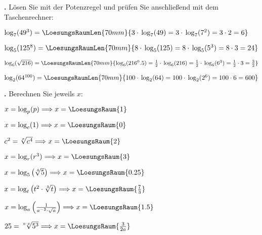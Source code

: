 \newpage

\textbf{\bbwAufgabenNummer{}.}
Lösen Sie mit der Potenzregel und prüfen Sie anschließend mit dem Taschenrechner: 

\begin{bbwAufgabenBlock}
\item $\log_7(49^3) = \LoesungsRaumLen{70mm}{3\cdot{}\log_7(49) = 3 \cdot{}  \log_7(7^2) = 3\cdot{} 2 = 6}$

\item
 $\log_5(125^8) = \LoesungsRaumLen{70mm}{8 \cdot{}\log_5(125) = 8 \cdot{}  \log_5(5^3) =  8\cdot{} 3 = 24}$

\item  $\log_6(\sqrt{216}) = \LoesungsRaumLen{70mm}{\log_6(216^0.5)= \frac12
   \cdot{}\log_6(216) = \frac12 \cdot{}  \log_6(6^3) = \frac12\cdot{} 3 = \frac32}$
   
\item $\log_2(64^{100}) = \LoesungsRaumLen{70mm}{100 \cdot{}\log_2(64) = 100 \cdot{}  \log_2(2^6) =  100\cdot{} 6 = 600}$

%
\end{bbwAufgabenBlock}

\TNTeop{}

\newpage

\textbf{\bbwAufgabenNummer{}.}
Berechnen Sie jeweils $x$:

\begin{bbwAufgabenBlock}
\item $x=\log_p(p) \Longrightarrow x =    \LoesungsRaum{1}$
\item $x=\log_c(1) \Longrightarrow x =    \LoesungsRaum{0}$
\item $c^2= \sqrt[x]{c^4} \Longrightarrow x =    \LoesungsRaum{2}$

\item $x=\log_r(r^3) \Longrightarrow x =    \LoesungsRaum{3}$
\item $x=\log_5\left(\sqrt[4]{5}\right) \Longrightarrow x =    \LoesungsRaum{0.25}$
\item $x=\log_t\left(t^2\cdot{}\sqrt[3]{t}\right) \Longrightarrow x =    \LoesungsRaum{\frac73}$
\noTRAINER{\newpage}
\item $x=\log_a\left( \frac1{a^{-2}\cdot{} \sqrt{a}} \right) \Longrightarrow x =    \LoesungsRaum{1.5}$
\item $25=\sqrt[a\cdot{}x]{5^3}  \Longrightarrow x =    \LoesungsRaum{\frac3{2a}}$

\end{bbwAufgabenBlock}


